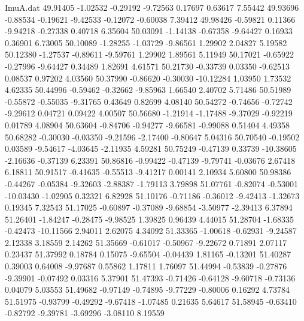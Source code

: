 \begin{filecontents}{ImuA.dat}
  49.91405   -1.02532   -0.29192   -9.72563    0.17697    0.63617    7.55442
  49.93696   -0.88534   -0.19621   -9.42533   -0.12072   -0.60038    7.39412
  49.98426   -0.59821    0.11366   -9.94218   -0.27338    0.40718    6.35604
  50.03091   -1.14138   -0.67358   -9.64427    0.16933    0.36901    6.73005
  50.10089   -1.28255   -1.03729   -9.86561    1.29902    2.04827    5.19582
  50.12380   -1.27537   -0.89611   -9.59761    1.29902    1.89561    5.11949
  50.17021   -0.65922   -0.27996   -9.64427    0.34489    1.82691    4.61571
  50.21730   -0.33739    0.03350   -9.62513    0.08537    0.97202    4.03560
  50.37990   -0.86620   -0.30030  -10.12284    1.03950    1.73532    4.62335
  50.44996   -0.59462   -0.32662   -9.85963    1.66540    2.40702    5.71486
  50.51989   -0.55872   -0.55035   -9.31765    0.43649    0.82699    4.08140
  50.54272   -0.74656   -0.72742   -9.29612    0.04721    0.09422    4.00507
  50.56680   -1.21914   -1.17488   -9.37029   -0.92219    0.01789    4.08904
  50.63604   -0.84706   -0.94277   -9.66581   -0.99088    0.51404    4.49358
  50.68282   -0.30030   -0.03350   -9.21596   -2.17400   -0.80647    5.04316
  50.70540   -0.19502    0.03589   -9.54617   -4.03645   -2.11935    4.59281
  50.75249   -0.47139    0.33739  -10.38605   -2.16636   -0.37139    6.23391
  50.86816   -0.99422   -0.47139   -9.79741   -0.03676    2.67418    6.18811
  50.91517   -0.41635   -0.55513   -9.41217    0.00141    2.10934    5.60800
  50.98386   -0.44267   -0.05384   -9.32603   -2.88387   -1.79113    3.79898
  51.07761   -0.82074   -0.53001  -10.03430   -1.02905    0.32321    6.82928
  51.10176   -0.71186   -0.36012   -9.42413   -1.32673    0.19345    7.32543
  51.17025   -0.60897   -0.37089   -9.68854   -3.50977   -2.39413    6.37894
  51.26401   -1.84247   -0.28475   -9.98525    1.39825    0.96439    4.44015
  51.28704   -1.68335   -0.42473  -10.11566    2.94011    2.62075    4.34092
  51.33365   -1.00618   -0.62931   -9.24587    2.12338    3.18559    2.14262
  51.35669   -0.61017   -0.50967   -9.22672    0.71891    2.07117    0.23437
  51.37992    0.18784    0.15075   -9.65504   -0.04439    1.81165   -0.13201
  51.40287    0.39003    0.64008   -9.97687    0.55862    1.17811    1.76097
  51.44994   -0.53839   -0.27876   -9.39901   -0.07492    0.03316    5.37901
  51.47393   -0.71426   -0.64128   -9.60718   -0.73136    0.04079    5.03553
  51.49682   -0.97149   -0.74895   -9.77229   -0.80006    0.16292    4.73784
  51.51975   -0.93799   -0.49292   -9.67418   -1.07485    0.21635    5.64617
  51.58945   -0.63410   -0.82792   -9.39781   -3.69296   -3.08110    8.19559

\end{filecontents}
